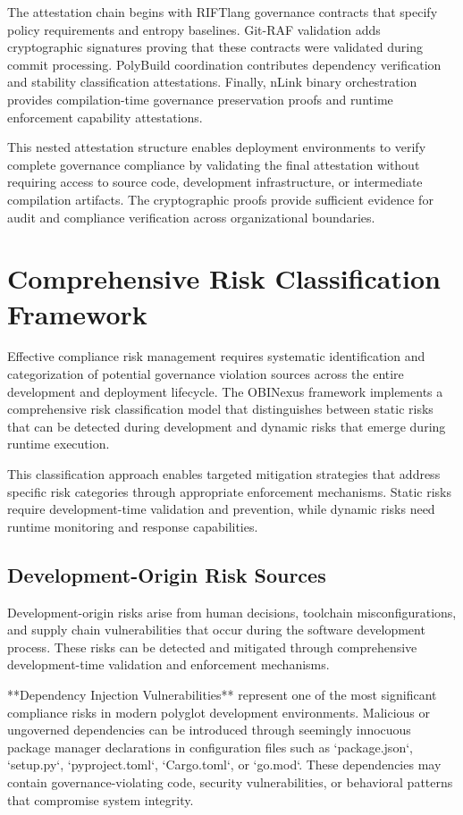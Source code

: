 The attestation chain begins with RIFTlang governance contracts that specify policy requirements and entropy baselines. Git-RAF validation adds cryptographic signatures proving that these contracts were validated during commit processing. PolyBuild coordination contributes dependency verification and stability classification attestations. Finally, nLink binary orchestration provides compilation-time governance preservation proofs and runtime enforcement capability attestations.

This nested attestation structure enables deployment environments to verify complete governance compliance by validating the final attestation without requiring access to source code, development infrastructure, or intermediate compilation artifacts. The cryptographic proofs provide sufficient evidence for audit and compliance verification across organizational boundaries.

\section{Comprehensive Risk Classification Framework}

Effective compliance risk management requires systematic identification and categorization of potential governance violation sources across the entire development and deployment lifecycle. The OBINexus framework implements a comprehensive risk classification model that distinguishes between static risks that can be detected during development and dynamic risks that emerge during runtime execution.

This classification approach enables targeted mitigation strategies that address specific risk categories through appropriate enforcement mechanisms. Static risks require development-time validation and prevention, while dynamic risks need runtime monitoring and response capabilities.

\subsection{Development-Origin Risk Sources}

Development-origin risks arise from human decisions, toolchain misconfigurations, and supply chain vulnerabilities that occur during the software development process. These risks can be detected and mitigated through comprehensive development-time validation and enforcement mechanisms.

**Dependency Injection Vulnerabilities** represent one of the most significant compliance risks in modern polyglot development environments. Malicious or ungoverned dependencies can be introduced through seemingly innocuous package manager declarations in configuration files such as `package.json`, `setup.py`, `pyproject.toml`, `Cargo.toml`, or `go.mod`. These dependencies may contain governance-violating code, security vulnerabilities, or behavioral patterns that compromise system integrity.

